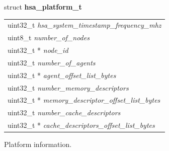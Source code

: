 \documentclass{book}
\newcommand{\hsaarg}[1]{\textit{#1}}
\newcommand{\hsadef}[2]{\hypertarget{#1}{\textbf{#2}}}
\begin{document}
\makeatletter{}

\noindent\begin{tcolorbox}[breakable,nobeforeafter,arc=0mm,colframe=white,colback=lightgray,left=0mm]
struct \hsadef{group__platform_1gac15087b44d735fd1479fc754de556a00}{hsa\_platform\_t}
\vspace{-3.5mm}\begin{longtable}{@{}p{\textwidth}}
\hspace{1.7em}uint32\_t \hsaarg{hsa\_system\_timestamp\_frequency\_mhz}\\
\hspace{1.7em}uint8\_t \hsaarg{number\_of\_nodes}\\
\hspace{1.7em}uint32\_t * \hsaarg{node\_id}\\
\hspace{1.7em}uint32\_t \hsaarg{number\_of\_agents}\\
\hspace{1.7em}uint32\_t * \hsaarg{agent\_offset\_list\_bytes}\\
\hspace{1.7em}uint32\_t \hsaarg{number\_memory\_descriptors}\\
\hspace{1.7em}uint32\_t * \hsaarg{memory\_descriptor\_offset\_list\_bytes}\\
\hspace{1.7em}uint32\_t \hsaarg{number\_cache\_descriptors}\\
\hspace{1.7em}uint32\_t * \hsaarg{cache\_descriptors\_offset\_list\_bytes}
\end{longtable}

\end{tcolorbox}
Platform information.
\end{document}
